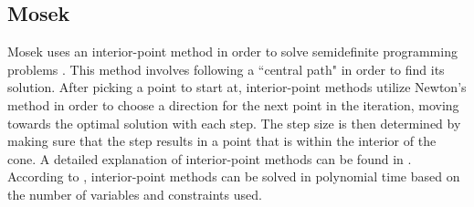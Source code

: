 	\subsection{Mosek}
	
	Mosek uses an interior-point method in order to solve semidefinite programming problems \cite{mosek}. This method involves following a ``central path" in order to find its solution. After picking a point to start at, interior-point methods utilize Newton's method in order to choose a direction for the next point in the iteration, moving towards the optimal solution with each step. The step size is then determined by making sure that the step results in a point that is within the interior of the cone. A detailed explanation of interior-point methods can be found in \cite{Nocedal06}. According to \cite{Borchers1999a}, interior-point methods can be solved in polynomial time based on the number of variables and constraints used.
	
